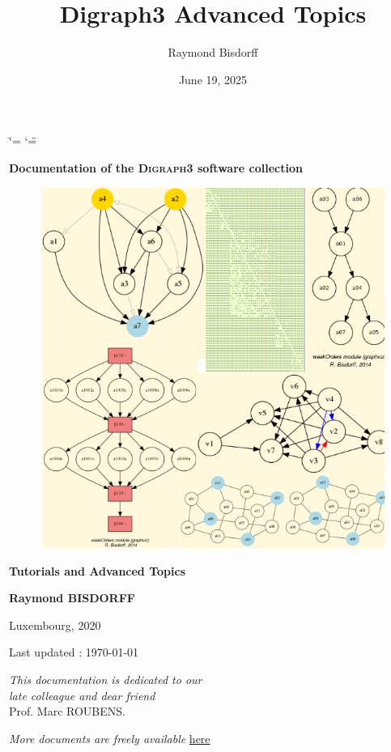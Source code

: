 \documentclass[a4paper,12pt,english]{sphinxhowto}
\title{Digraph3 Advanced Topics}
\date{June 19, 2025}
\author{Raymond Bisdorff}
\begin{document}
\ifdefined\shorthandoff
  \ifnum\catcode`\=\string=\active\shorthandoff{=}\fi
  \ifnum\catcode`\"=\active{}\fi
\fi

\pagestyle{empty}


    \begin{titlepage}
        \centering

        \vspace*{10mm} %
        \textbf{\Large {Documentation of the \textsc{Digraph3} software collection}}

        \vspace{5mm}
        \begin{figure}[!h]
            \centering
            \includegraphics[scale=0.5]{introDoc3.png}
        \end{figure}

        \vspace{10mm}
        \textbf{\Huge {Tutorials and Advanced Topics}}

        \textbf{Raymond BISDORFF}

        \small Luxembourg,  2020

        \small  Last updated : \today
        
        \vspace{10mm}
        \begin{center}
        \emph{This documentation is dedicated to our}\\
        \emph{late colleague and dear friend}\\
         Prof. Marc ROUBENS.
        \end{center}

        \vfill
        \textit{More documents are freely available }{\href{https://digraph3.readthedocs.io/en/latest}{here}}
    \end{titlepage}
\end{document}
